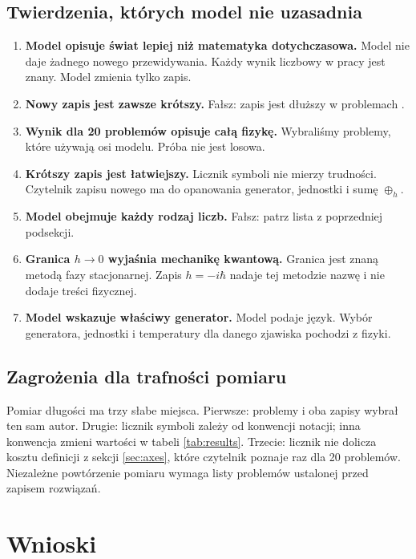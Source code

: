 \documentclass[11pt,a4paper]{article}
\newcommand{\oph}{\mathbin{\oplus_{h}}}       %
\begin{document}
\subsection{Twierdzenia, których model nie uzasadnia}

\begin{enumerate}[leftmargin=1.6em]
  \item \textbf{Model opisuje świat lepiej niż matematyka dotychczasowa.}
        Model nie daje żadnego nowego przewidywania. Każdy wynik liczbowy
        w pracy jest znany. Model zmienia tylko zapis.
  \item \textbf{Nowy zapis jest zawsze krótszy.} Fałsz: zapis jest dłuższy
        w problemach \gcLongerIds.
  \item \textbf{Wynik dla 20 problemów opisuje całą fizykę.} Wybraliśmy
        problemy, które używają osi modelu. Próba nie jest losowa.
  \item \textbf{Krótszy zapis jest łatwiejszy.} Licznik symboli nie mierzy
        trudności. Czytelnik zapisu nowego ma do opanowania generator,
        jednostki i sumę $\oph$.
  \item \textbf{Model obejmuje każdy rodzaj liczb.} Fałsz: patrz lista
        z poprzedniej podsekcji.
  \item \textbf{Granica $h\to0$ wyjaśnia mechanikę kwantową.} Granica jest
        znaną metodą fazy stacjonarnej. Zapis $h=-i\hbar$ nadaje tej metodzie
        nazwę i nie dodaje treści fizycznej.
  \item \textbf{Model wskazuje właściwy generator.} Model podaje język.
        Wybór generatora, jednostki i temperatury dla danego zjawiska pochodzi
        z fizyki.
\end{enumerate}

\subsection{Zagrożenia dla trafności pomiaru}

Pomiar długości ma trzy słabe miejsca. Pierwsze: problemy i oba zapisy wybrał
ten sam autor. Drugie: licznik symboli zależy od konwencji notacji; inna
konwencja zmieni wartości w tabeli \ref{tab:results}. Trzecie: licznik nie
dolicza kosztu definicji z sekcji \ref{sec:axes}, które czytelnik poznaje raz
dla 20 problemów. Niezależne powtórzenie pomiaru wymaga listy problemów
ustalonej przed zapisem rozwiązań.

\section{Wnioski}
\end{document}
